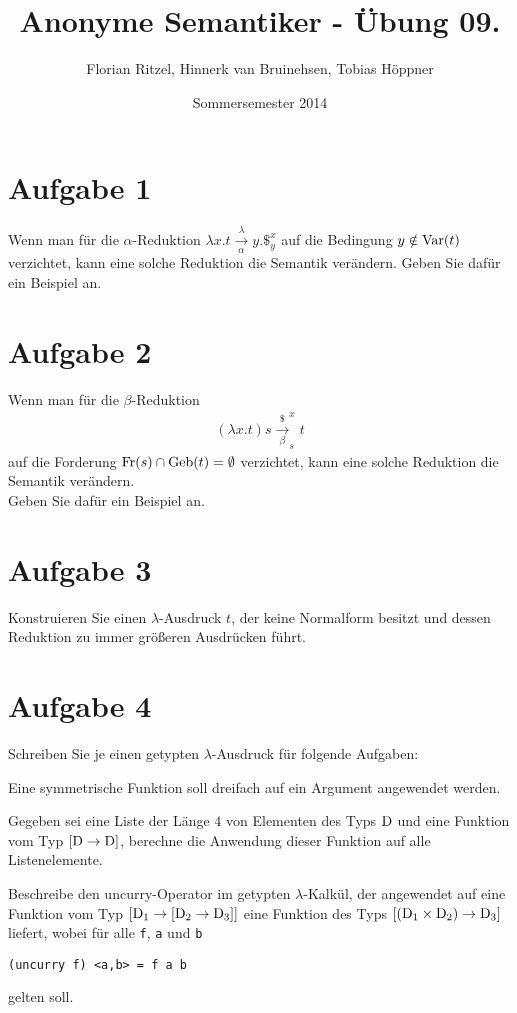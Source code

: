 \documentclass[ngerman,a4paper]{report}
\author{Florian Ritzel, Hinnerk van Bruinehsen, Tobias Höppner}
\title{Anonyme Semantiker - Übung 09. }
\date{Sommersemester 2014}
\renewcommand{\maketitle}{}
\begin{document}
\maketitle
\section*{Aufgabe 1}
Wenn man für die $\alpha$-Reduktion $\lambda x.t \xrightarrow[\alpha] \lambda y.\$_y^x$ auf die Bedingung $y \notin \text{\lstinline!Var!}(t)$ verzichtet, kann eine solche Reduktion die Semantik verändern. Geben Sie dafür ein Beispiel an.\\

\section*{Aufgabe 2}
Wenn man für die $\beta$-Reduktion
\begin{align*}
(\lambda x.t) s \xrightarrow[\beta] \$_s^x t
\end{align*}
auf die Forderung $\text{\lstinline!Fr!}(s) \cap \text{\lstinline!Geb!}(t) = \emptyset$ verzichtet, kann eine solche Reduktion die Semantik verändern.\\
Geben Sie dafür ein Beispiel an.

\section*{Aufgabe 3}
Konstruieren Sie einen $\lambda$-Ausdruck $t$, der keine Normalform besitzt und dessen Reduktion zu immer größeren Ausdrücken führt.\\

\section*{Aufgabe 4}
Schreiben Sie je einen getypten $\lambda$-Ausdruck für folgende Aufgaben:
\begin{compactenum}
\item Eine symmetrische Funktion soll dreifach auf ein Argument angewendet werden.
\item Gegeben sei eine Liste der Länge $4$ von Elementen des Typs $\text{\lstinline!D!}$ und eine Funktion vom Typ $[\text{\lstinline!D!} \rightarrow \text{\lstinline!D!}]$, berechne die Anwendung dieser Funktion auf alle Listenelemente.
\item Beschreibe den uncurry-Operator im getypten $\lambda$-Kalkül, der angewendet auf eine Funktion vom Typ $[\text{\lstinline!D!}_1 \rightarrow [\text{\lstinline!D!}_2 \rightarrow \text{\lstinline!D!}_3]]$ eine Funktion des Typs $[(\text{\lstinline!D!}_1 \times \text{\lstinline!D!}_2) \rightarrow \text{\lstinline!D!}_3]$ liefert, wobei für alle \lstinline!f!, \lstinline!a! und \lstinline!b!
\begin{lstlisting}
(uncurry f) <a,b> = f a b
\end{lstlisting}
gelten soll.
\end{compactenum}
\end{document}
